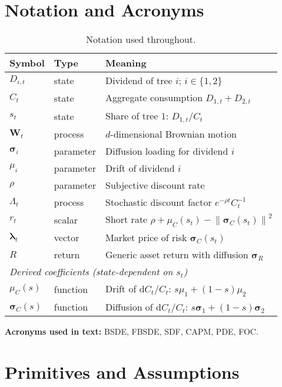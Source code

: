 ﻿\documentclass[11pt,letterpaper,oneside]{article}
\numberwithin{equation}{section}
\newcommand{\ac}[1]{{\mdseries\textsc{#1}}}
\newcommand{\printacronyms}{}
\newcommand{\1}{\mathbf{1}}
\newcommand{\diff}{\mathrm{d}}
\newcommand{\norm}[1]{\left\lVert #1\right\rVert}
\begin{document}
\newpage
\section{Notation and Acronyms}

\begin{table}[ht]
  \centering
  \small
  \begin{tabular}{@{} l l p{}@{}}
  \toprule
  \textbf{Symbol} & \textbf{Type} & \textbf{Meaning} \\
  \midrule
  $D_{i,t}$ & state & Dividend of tree $i$; $i\in\{1,2\}$ \\
  $C_t$ & state & Aggregate consumption $D_{1,t}+D_{2,t}$ \\
  $s_t$ & state & Share of tree $1$: $D_{1,t}/C_t$ \\
  $\bm{W}_t$ & process & $d$-dimensional Brownian motion \\
  $\bm{\sigma}_i$ & parameter & Diffusion loading for dividend $i$ \\
  $\mu_i$ & parameter & Drift of dividend $i$ \\
  $\rho$ & parameter & Subjective discount rate \\
  $\Lambda_t$ & process & Stochastic discount factor $e^{-\rho t} C_t^{-1}$ \\
  $r_t$ & scalar & Short rate $\rho+\mu_C(s_t)-\norm{\bm{\sigma}_C(s_t)}^2$ \\
  $\bm{\lambda}_t$ & vector & Market price of risk $\bm{\sigma}_C(s_t)$ \\
  $R$ & return & Generic asset return with diffusion $\bm{\sigma}_R$ \\
  \midrule
  \multicolumn{3}{l}{\textit{Derived coefficients (state-dependent on $s_t$)}} \\
  $\mu_C(s)$ & function & Drift of $\diff C_t/C_t$: $s\mu_1+(1-s)\mu_2$ \\
  $\bm{\sigma}_C(s)$ & function & Diffusion of $\diff C_t/C_t$: $s\bm{\sigma}_1+(1-s)\bm{\sigma}_2$ \\
  \bottomrule
  \end{tabular}
  \caption{Notation used throughout.}
\end{table}

\medskip
\noindent\textbf{Acronyms used in text:} \ac{BSDE}, \ac{FBSDE}, \ac{SDF}, \ac{CAPM}, \ac{PDE}, \ac{FOC}.
\medskip

\printacronyms

\clearpage
\section{Primitives and Assumptions}
\end{document}
